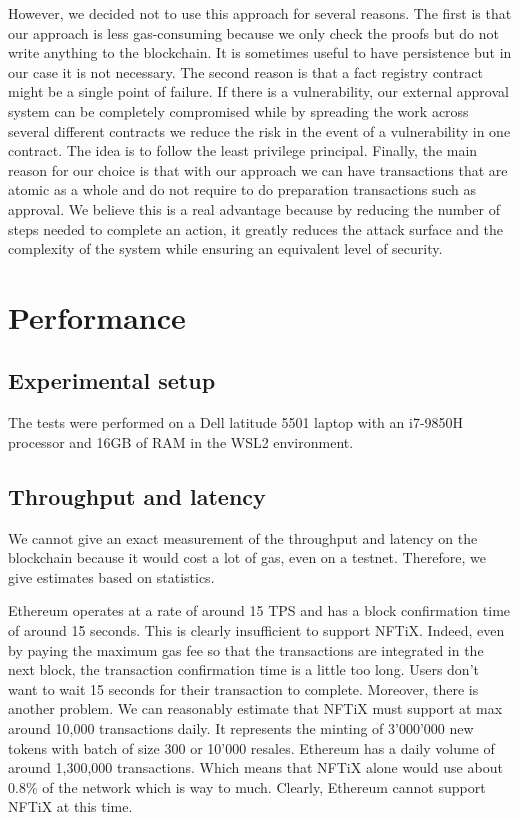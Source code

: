 \documentclass[a4paper,11pt,oneside]{report}
\begin{document}
However, we decided not to use this approach for several reasons. The first is that our approach is less gas-consuming because we only check the proofs but do not write anything to the blockchain. It is sometimes useful to have persistence but in our case it is not necessary. The second reason is that a fact registry contract might be a single point of failure. If there is a vulnerability, our external approval system can be completely compromised while by spreading the work across several different contracts we reduce the risk in the event of a vulnerability in one contract. The idea is to follow the least privilege principal. Finally, the main reason for our choice is that with our approach we can have transactions that are atomic as a whole and do not require to do preparation transactions such as approval. We believe this is a real advantage because by reducing the number of steps needed to complete an action, it greatly reduces the attack surface and the complexity of the system while ensuring an equivalent level of security.

\section{Performance}

\subsection{Experimental setup}
The tests were performed on a Dell latitude 5501 laptop with an i7-9850H processor and 16GB of RAM in the WSL2 environment.

\subsection{Throughput and latency}
We cannot give an exact measurement of the throughput and latency on the blockchain because it would cost a lot of gas, even on a testnet. Therefore, we give estimates based on statistics.

Ethereum operates at a rate of around 15 TPS and has a block confirmation time of around 15 seconds. This is clearly insufficient to support NFTiX. Indeed, even by paying the maximum gas fee so that the transactions are integrated in the next block, the transaction confirmation time is a little too long. Users don't want to wait 15 seconds for their transaction to complete. Moreover, there is another problem. We can reasonably estimate that NFTiX must support at max around 10,000 transactions daily. It represents the minting of 3'000'000 new tokens with batch of size 300 or 10'000 resales. Ethereum has a daily volume of around 1,300,000 transactions. Which means that NFTiX alone would use about 0.8\% of the network which is way to much. Clearly, Ethereum cannot support NFTiX at this time.
\end{document}
